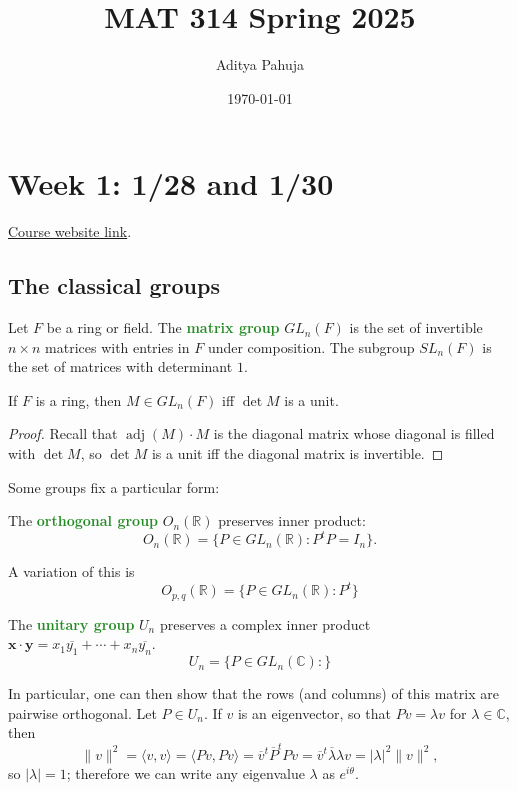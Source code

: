 \documentclass[10pt]{scrartcl}
\title{\vspace{-2.0cm} MAT 314 Spring 2025}
\author{\large Aditya Pahuja}
\date{\large \today}
\providecommand{\ol}{\overline}
\providecommand{\CC}{\mathbb C}
\providecommand{\RR}{\mathbb R}
\providecommand{\opname}{\operatorname}
\providecommand{\mb}[1]{\mathbf{#1}}
\providecommand{\vocab}[1]{{\textbf{\textcolor{ForestGreen}{#1}}}}
\begin{document}
\maketitle
\tableofcontents
\pagebreak

\section{Week 1: 1/28 and 1/30}

\href{https://www.math.stonybrook.edu/~rdhough/mat314_spring25/math314.html}
{Course website link}.

\subsection{The classical groups}
\begin{definition}
	Let $F$ be a ring or field.
	The \vocab{matrix group} $GL_n(F)$ is the set of
	invertible $n\times n$ matrices with entries in $F$
	under composition.
	The subgroup $SL_n(F)$ is the set of matrices with determinant $1$.
\end{definition}

\begin{prop}
	If $F$ is a ring, then $M\in GL_n(F)$ iff $\det M$ is a unit.
\end{prop}

\begin{proof}
	Recall that $\opname{adj}(M)\cdot M$ is the diagonal matrix
	whose diagonal is filled with $\det M$,
	so $\det M$ is a unit iff the diagonal matrix is invertible.
\end{proof}

Some groups fix a particular form:
\begin{definition}
	The \vocab{orthogonal group} $O_n(\RR)$ preserves inner product:
	\[O_n(\RR) = \{P\in GL_n(\RR) : P^tP = I_n\}.\]
\end{definition}

A variation of this is
\[O_{p,q}(\RR) = \{P\in GL_n(\RR) : P^t\}\]

\begin{definition}
	The \vocab{unitary group} $U_n$ preserves a complex inner product
	$\mb x\cdot\mb y = x_1\ol{y_1} + \cdots + x_n\ol{y_n}$.
	\[U_n = \{P\in GL_n(\CC) : \}\]
\end{definition}

In particular, one can then show that the rows (and columns) of this matrix
are pairwise orthogonal. Let $P\in U_n$.
If $v$ is an eigenvector, so that $Pv = \lambda v$ for $\lambda\in\CC$, then
\[\|v\|^2 = \langle v,v\rangle = \langle Pv, Pv\rangle =
\ol v^t \ol P^t Pv = \ol v^t\ol\lambda \lambda v = |\lambda|^2\|v\|^2,\]
so $|\lambda| = 1$; therefore we can write any eigenvalue $\lambda$ as
$e^{i\theta}$.
\end{document}
